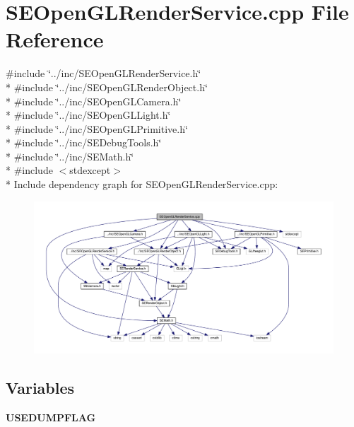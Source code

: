 \section{S\+E\+Open\+G\+L\+Render\+Service.\+cpp File Reference}
\label{_s_e_open_g_l_render_service_8cpp}
{\ttfamily \#include \char`\"{}../inc/\+S\+E\+Open\+G\+L\+Render\+Service.\+h\char`\"{}}\\*
{\ttfamily \#include \char`\"{}../inc/\+S\+E\+Open\+G\+L\+Render\+Object.\+h\char`\"{}}\\*
{\ttfamily \#include \char`\"{}../inc/\+S\+E\+Open\+G\+L\+Camera.\+h\char`\"{}}\\*
{\ttfamily \#include \char`\"{}../inc/\+S\+E\+Open\+G\+L\+Light.\+h\char`\"{}}\\*
{\ttfamily \#include \char`\"{}../inc/\+S\+E\+Open\+G\+L\+Primitive.\+h\char`\"{}}\\*
{\ttfamily \#include \char`\"{}../inc/\+S\+E\+Debug\+Tools.\+h\char`\"{}}\\*
{\ttfamily \#include \char`\"{}../inc/\+S\+E\+Math.\+h\char`\"{}}\\*
{\ttfamily \#include $<$stdexcept$>$}\\*
Include dependency graph for S\+E\+Open\+G\+L\+Render\+Service.\+cpp\+:
\nopagebreak
\begin{figure}[H]
\begin{center}
\leavevmode
\includegraphics[width=350pt]{_s_e_open_g_l_render_service_8cpp__incl}
\end{center}
\end{figure}
\subsection*{Variables}
\begin{DoxyCompactItemize}
\item 
{\bf U\+S\+E\+D\+U\+M\+P\+F\+L\+A\+G}
\end{DoxyCompactItemize}


